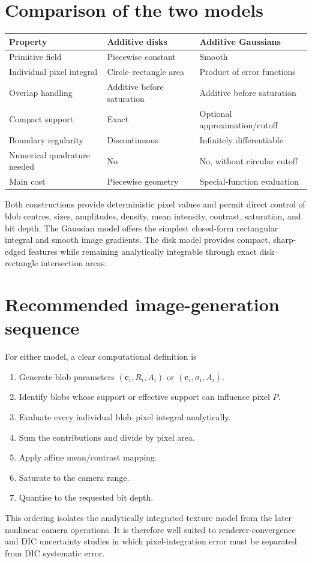 \documentclass[11pt,a4paper]{article}
\begin{document}
\section{Comparison of the two models}

\begin{table}[ht]
\centering
\small
\begin{tabular}{@{}lll@{}}
\toprule
Property & Additive disks & Additive Gaussians \\
\midrule
Primitive field & Piecewise constant & Smooth \\
Individual pixel integral & Circle--rectangle area & Product of error functions \\
Overlap handling & Additive before saturation & Additive before saturation \\
Compact support & Exact & Optional approximation/cutoff \\
Boundary regularity & Discontinuous & Infinitely differentiable \\
Numerical quadrature needed & No & No, without circular cutoff \\
Main cost & Piecewise geometry & Special-function evaluation \\
\bottomrule
\end{tabular}
\end{table}

Both constructions provide deterministic pixel values and permit direct control of
blob centres, sizes, amplitudes, density, mean intensity, contrast, saturation, and
bit depth. The Gaussian model offers the simplest closed-form rectangular integral
and smooth image gradients. The disk model provides compact, sharp-edged features
while remaining analytically integrable through exact disk--rectangle intersection
areas.

\section{Recommended image-generation sequence}

For either model, a clear computational definition is
\begin{enumerate}[leftmargin=*,itemsep=2pt]
\item Generate blob parameters $(\bm{c}_i,R_i,A_i)$ or
      $(\bm{c}_i,\sigma_i,A_i)$.
\item Identify blobs whose support or effective support can influence pixel $P$.
\item Evaluate every individual blob--pixel integral analytically.
\item Sum the contributions and divide by pixel area.
\item Apply affine mean/contrast mapping.
\item Saturate to the camera range.
\item Quantise to the requested bit depth.
\end{enumerate}

This ordering isolates the analytically integrated texture model from the later
nonlinear camera operations. It is therefore well suited to renderer-convergence
and DIC uncertainty studies in which pixel-integration error must be separated from
DIC systematic error.
\end{document}
